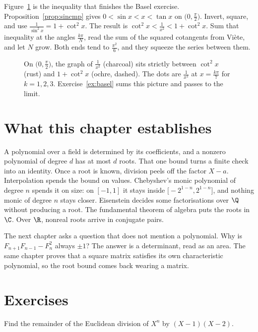Figure~\ref{fig:cotsqueeze} is the inequality that finishes the Basel exercise. Proposition~\ref{prop:sincmp} gives $0<\sin x<x<\tan x$ on $\bigl(0,\frac\pi2\bigr)$. Invert, square, and use $\frac1{\sin^2 x}=1+\cot^2 x$. The result is $\cot^2 x<\frac1{x^2}<1+\cot^2 x$. Sum that inequality at the angles $\frac{k\pi}N$, read the sum of the squared cotangents from Vi\`ete, and let $N$ grow. Both ends tend to $\frac{\pi^2}6$, and they squeeze the series between them.

\begin{figure}[ht]
\centering
{}
\caption{On $\bigl(0,\frac\pi2\bigr)$, the graph of $\frac1{x^2}$ (charcoal) sits strictly between $\cot^2x$ (rust) and $1+\cot^2x$ (ochre, dashed). The dots are $\frac1{x^2}$ at $x=\frac{k\pi}7$ for $k=1,2,3$. Exercise~\ref{ex:basel} sums this picture and passes to the limit.}
\label{fig:cotsqueeze}
\end{figure}

\section*{What this chapter establishes}
A polynomial over a field is determined by its coefficients, and a nonzero polynomial of degree $d$ has at most $d$ roots. That one bound turns a finite check into an identity. Once a root is known, division peels off the factor $X-a$. Interpolation spends the bound on values. Chebyshev's monic polynomial of degree $n$ spends it on size: on $[-1,1]$ it stays inside $\bigl[-2^{1-n},2^{1-n}\bigr]$, and nothing monic of degree $n$ stays closer. Eisenstein decides some factorisations over $\Q$ without producing a root. The fundamental theorem of algebra puts the roots in $\C$. Over $\R$, nonreal roots arrive in conjugate pairs.

The next chapter asks a question that does not mention a polynomial. Why is $F_{n+1}F_{n-1}-F_n^2$ always $\pm1$? The answer is a determinant, read as an area. The same chapter proves that a square matrix satisfies its own characteristic polynomial, so the root bound comes back wearing a matrix.

\section{Exercises}

\begin{exercise}[$\star$]\label{ex:rem}
Find the remainder of the Euclidean division of $X^n$ by $(X-1)(X-2)$.
\end{exercise}

